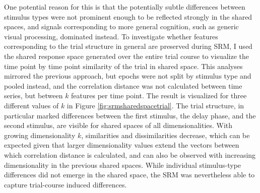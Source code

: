 
One potential reason for this is that the potentially subtle differences between stimulus types were not prominent enough to be reflected strongly in the shared spaces, and signals corresponding to more general cognition, such as generic visual processing, dominated instead.
To investigate whether features corresponding to the trial structure in general are preserved during \gls{SRM}, I used the shared response space generated over the entire trial course to visualize the time point by time point similarity of the trial in shared space.
This analyses mirrored the previous approach, but epochs were not split by stimulus type and pooled instead, and the correlation distance was not calculated between time series, but between $k$ features per time point.
The result is visualized for three different values of $k$ in Figure \ref{fig:srmsharedspacetrial}.
The trial structure, in particular marked differences between the first stimulus, the delay phase, and the second stimulus, are visible for shared spaces of all dimensionalities.
With growing dimensionality $k$, similarities and dissimilarities decrease, which can be expected given that larger dimensionality values extend the vectors between which correlation distance is calculated, and can also be observed with increasing dimensionality in the previous shared spaces.
While individual stimulus-type differences did not emerge in the shared space, the \gls{SRM} was nevertheless able to capture trial-course induced differences.

